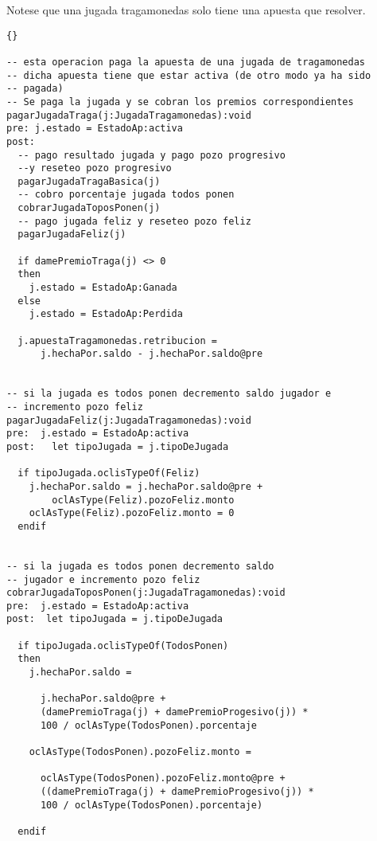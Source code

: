 
\begin{framed}

\depto Notese que una jugada tragamonedas solo tiene una apuesta que resolver.


\lstset{language=ocl}
\lstset{commentstyle=\textit}
\begin{lstlisting}[frame=trbl]{}

-- esta operacion paga la apuesta de una jugada de tragamonedas
-- dicha apuesta tiene que estar activa (de otro modo ya ha sido 
-- pagada) 
-- Se paga la jugada y se cobran los premios correspondientes
pagarJugadaTraga(j:JugadaTragamonedas):void
pre: j.estado = EstadoAp:activa
post: 
  -- pago resultado jugada y pago pozo progresivo 
  --y reseteo pozo progresivo
  pagarJugadaTragaBasica(j)
  -- cobro porcentaje jugada todos ponen
  cobrarJugadaToposPonen(j)
  -- pago jugada feliz y reseteo pozo feliz
  pagarJugadaFeliz(j)
  
  if damePremioTraga(j) <> 0
  then 
    j.estado = EstadoAp:Ganada
  else
    j.estado = EstadoAp:Perdida
    
  j.apuestaTragamonedas.retribucion = 
      j.hechaPor.saldo - j.hechaPor.saldo@pre


-- si la jugada es todos ponen decremento saldo jugador e 
-- incremento pozo feliz
pagarJugadaFeliz(j:JugadaTragamonedas):void
pre:  j.estado = EstadoAp:activa
post:   let tipoJugada = j.tipoDeJugada

  if tipoJugada.oclisTypeOf(Feliz)
    j.hechaPor.saldo = j.hechaPor.saldo@pre + 
        oclAsType(Feliz).pozoFeliz.monto
    oclAsType(Feliz).pozoFeliz.monto = 0
  endif


-- si la jugada es todos ponen decremento saldo 
-- jugador e incremento pozo feliz
cobrarJugadaToposPonen(j:JugadaTragamonedas):void
pre:  j.estado = EstadoAp:activa
post:  let tipoJugada = j.tipoDeJugada

  if tipoJugada.oclisTypeOf(TodosPonen)
  then 
    j.hechaPor.saldo = 

      j.hechaPor.saldo@pre +
      (damePremioTraga(j) + damePremioProgesivo(j)) * 
      100 / oclAsType(TodosPonen).porcentaje
    
    oclAsType(TodosPonen).pozoFeliz.monto = 

      oclAsType(TodosPonen).pozoFeliz.monto@pre + 
      ((damePremioTraga(j) + damePremioProgesivo(j)) * 
      100 / oclAsType(TodosPonen).porcentaje)
      
  endif




\end{lstlisting}
\end{framed}
